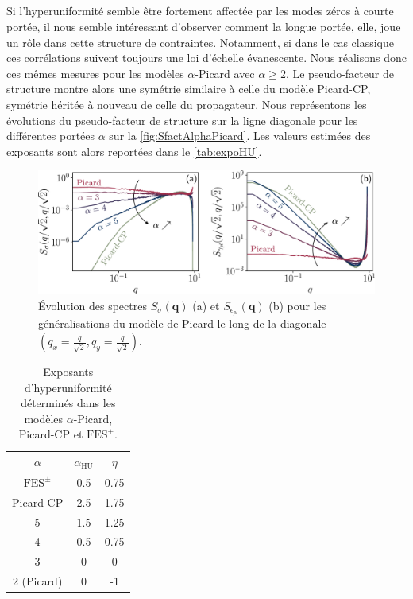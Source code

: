 \subparagraph{}Si l'hyperuniformité semble être fortement affectée par les modes zéros à courte portée, il nous semble intéressant d'observer comment la longue portée, elle, joue un rôle dans cette structure de contraintes. Notamment, si dans le cas classique ces corrélations suivent toujours une loi d'échelle évanescente. Nous réalisons donc ces mêmes mesures pour les modèles $\alpha$-Picard avec $\alpha \geq 2$. Le pseudo-facteur de structure montre alors une symétrie similaire à celle du modèle Picard-CP, symétrie héritée à nouveau de celle du propagateur. Nous représentons les évolutions du pseudo-facteur de structure sur la ligne diagonale pour les différentes portées $\alpha$ sur la \autoref{fig:SfactAlphaPicard}. Les valeurs estimées des exposants sont alors reportées dans le \autoref{tab:expoHU}.

\begin{figure}[h]
	\centering
	\includegraphics[width=\textwidth]{Chapitre4/Figures/Correlations/Evol_Sfact.pdf}
	\caption{Évolution des spectres $S_\sigma(\mathbf{q})$ (a) et $S_{\epsilon_{pl}}(\mathbf{q})$ (b) pour les généralisations du modèle de Picard le long de la diagonale $(q_x=\frac{q}{\sqrt{2}},q_y=\frac{q}{\sqrt{2}})$.}
	\label{fig:SfactAlphaPicard}
\end{figure}

\begin{table}[h]
\centering
\begin{tabular}{ccc}
\hline \hline $\alpha$ & $\alpha_\text{HU}$ & $\eta$ \\
\hline 
$\text{FES}^\pm$ & 0.5 & 0.75  \\
Picard-CP & 2.5 & 1.75  \\
5 & 1.5 & 1.25  \\
4 & 0.5 & 0.75  \\
3 & 0 & 0  \\
2 (Picard) & 0 & -1 \\
\hline \hline
\end{tabular}
\caption{Exposants d'hyperuniformité déterminés dans les modèles $\alpha$-Picard, Picard-CP et $\text{FES}^\pm$.}
\label{tab:expoHU}
\end{table}

